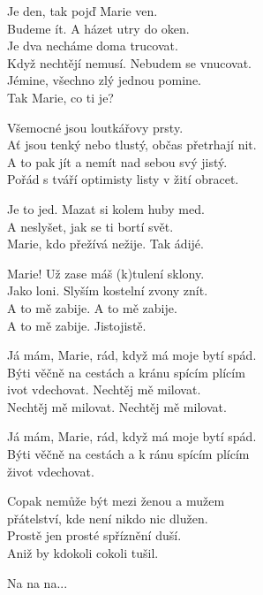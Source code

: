 
\ve{}
Je den, tak pojď Marie ven.\\
Budeme ít. A házet utry do oken.\\
Je dva necháme doma trucovat.\\
Když nechtějí nemusí. Nebudem se vnucovat.\\
Jémine, všechno zlý jednou pomine.\\
Tak Marie, co ti je? 

\vspace{-0.1cm}
\ve{}
Všemocné jsou loutkářovy prsty.\\
Ať jsou tenký nebo tlustý, občas přetrhají nit.\\
A to pak jít a nemít nad sebou svý jistý.\\
Pořád s tváří optimisty listy v žití obracet. 

\vspace{-0.1cm}
\ve{}
Je to jed. Mazat si kolem huby med.\\
A neslyšet, jak se ti bortí svět.\\
Marie, kdo přežívá nežije. Tak ádijé.

\vspace{-0.1cm}
\ve{}
Marie! Už zase máš (k)tulení sklony.\\
Jako loni. Slyším kostelní zvony znít.\\
A to mě zabije. A to mě zabije.\\
A to mě zabije. Jistojistě. 

\vspace{-0.1cm}
\cho{} 
Já mám, Marie, rád, když má moje bytí spád.\\
Býti věčně na cestách a kránu spícím plícím\\
ivot vdechovat. Nechtěj mě milovat.\\
Nechtěj mě milovat. Nechtěj mě milovat.  

Já mám, Marie, rád, když má moje bytí spád.\\
Býti věčně na cestách a k ránu spícím plícím\\
život vdechovat. 

\vspace{-0.1cm}
\ve{}
Copak nemůže být mezi ženou a mužem\\
přátelství, kde není nikdo nic dlužen.\\
Prostě jen prosté spříznění duší.\\
Aniž by kdokoli cokoli tušil.

Na na na...

\vspace{-0.1cm}
\cho{}

\esong